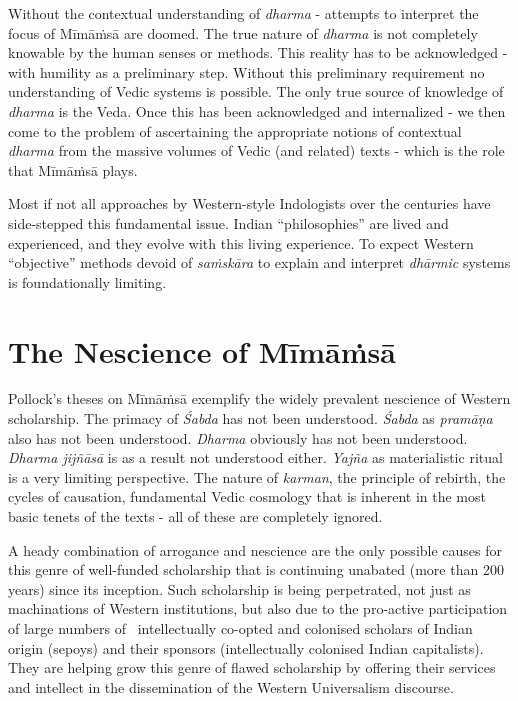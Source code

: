 Without the contextual understanding of \textit{dharma }- attempts to interpret the focus of Mīmāṁsā are doomed. The true nature of \textit{dharma} is not completely knowable by the human senses or methods. This reality has to be acknowledged - with humility as a preliminary step. Without this preliminary requirement no understanding of Vedic systems is possible. The only true source of knowledge of \textit{dharma} is the Veda. Once this has been acknowledged and internalized - we then come to the problem of ascertaining the appropriate notions of contextual \textit{dharma} from the massive volumes of Vedic (and related) texts - which is the role that Mīmāṁsā plays.

Most if not all approaches by Western-style Indologists over the centuries have side-stepped this fundamental issue. Indian “philosophies” are lived and experienced, and they evolve with this living experience. To expect Western “objective” methods devoid of \textit{saṁskāra} to explain and interpret \textit{dhārmic} systems is foundationally limiting.


\section*{The Nescience of Mīmāṁsā}

Pollock’s theses on Mīmāṁsā exemplify the widely prevalent nescience of Western scholarship. The primacy of \textit{Śabda} has not been understood. \textit{Śabda} as \textit{pramāṇa} also has not been understood. \textit{Dharma} obviously has not been understood. \textit{Dharma jijñāsā} is as a result not understood either. \textit{Yajña} as materialistic ritual is a very limiting perspective. The nature of \textit{karman}, the principle of rebirth, the cycles of causation, fundamental Vedic cosmology that is inherent in the most basic tenets of the texts - all of these are completely ignored.

A heady combination of arrogance and nescience are the only possible causes for this genre of well-funded scholarship that is continuing unabated (more than 200 years) since its inception. Such scholarship is being perpetrated, not just as machinations of Western institutions, but also due to the pro-active participation of large numbers of  intellectually co-opted and colonised scholars of Indian origin (sepoys) and their sponsors (intellectually colonised Indian capitalists). They are helping grow this genre of flawed scholarship by offering their services and intellect in the dissemination of the Western Universalism discourse.



